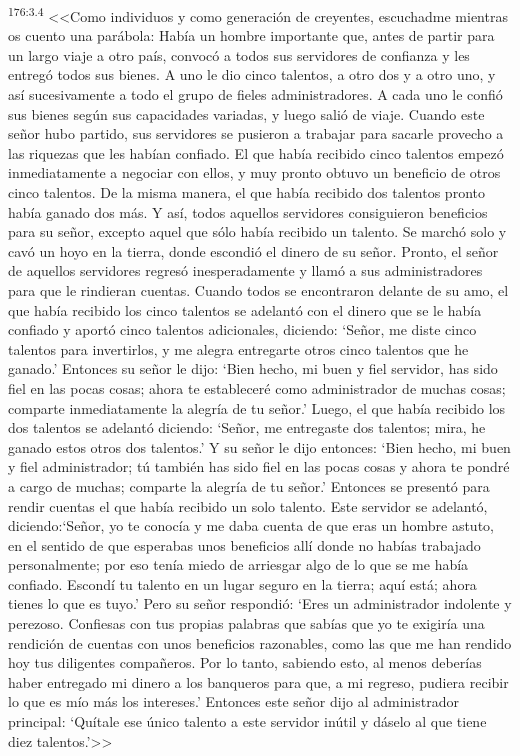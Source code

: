 \par 
\textsuperscript{176:3.4} <<Como individuos y como generación de creyentes, escuchadme mientras os cuento una parábola: Había un hombre importante que, antes de partir para un largo viaje a otro país, convocó a todos sus servidores de confianza y les entregó todos sus bienes. A uno le dio cinco talentos, a otro dos y a otro uno, y así sucesivamente a todo el grupo de fieles administradores. A cada uno le confió sus bienes según sus capacidades variadas, y luego salió de viaje. Cuando este señor hubo partido, sus servidores se pusieron a trabajar para sacarle provecho a las riquezas que les habían confiado. El que había recibido cinco talentos empezó inmediatamente a negociar con ellos, y muy pronto obtuvo un beneficio de otros cinco talentos. De la misma manera, el que había recibido dos talentos pronto había ganado dos más. Y así, todos aquellos servidores consiguieron beneficios para su señor, excepto aquel que sólo había recibido un talento. Se marchó solo y cavó un hoyo en la tierra, donde escondió el dinero de su señor. Pronto, el señor de aquellos servidores regresó inesperadamente y llamó a sus administradores para que le rindieran cuentas. Cuando todos se encontraron delante de su amo, el que había recibido los cinco talentos se adelantó con el dinero que se le había confiado y aportó cinco talentos adicionales, diciendo: `Señor, me diste cinco talentos para invertirlos, y me alegra entregarte otros cinco talentos que he ganado.' Entonces su señor le dijo: `Bien hecho, mi buen y fiel servidor, has sido fiel en las pocas cosas; ahora te estableceré como administrador de muchas cosas; comparte inmediatamente la alegría de tu señor.' Luego, el que había recibido los dos talentos se adelantó diciendo: `Señor, me entregaste dos talentos; mira, he ganado estos otros dos talentos.' Y su señor le dijo entonces: `Bien hecho, mi buen y fiel administrador; tú también has sido fiel en las pocas cosas y ahora te pondré a cargo de muchas; comparte la alegría de tu señor.' Entonces se presentó para rendir cuentas el que había recibido un solo talento. Este servidor se adelantó, diciendo:`Señor, yo te conocía y me daba cuenta de que eras un hombre astuto, en el sentido de que esperabas unos beneficios allí donde no habías trabajado personalmente; por eso tenía miedo de arriesgar algo de lo que se me había confiado. Escondí tu talento en un lugar seguro en la tierra; aquí está; ahora tienes lo que es tuyo.' Pero su señor respondió: `Eres un administrador indolente y perezoso. Confiesas con tus propias palabras que sabías que yo te exigiría una rendición de cuentas con unos beneficios razonables, como las que me han rendido hoy tus diligentes compañeros. Por lo tanto, sabiendo esto, al menos deberías haber entregado mi dinero a los banqueros para que, a mi regreso, pudiera recibir lo que es mío más los intereses.' Entonces este señor dijo al administrador principal: `Quítale ese único talento a este servidor inútil y dáselo al que tiene diez talentos.'>>

